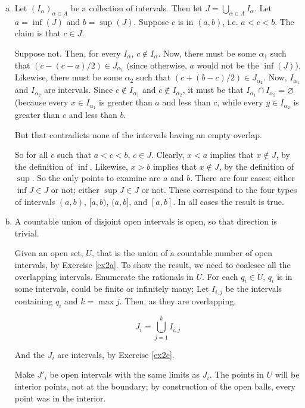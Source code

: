 \documentclass[11pt,oneside]{article}
\numberwithin{equation}{section}
\theoremstyle{definition}
\begin{document}
\begin{solution}
\begin{enumerate}[(a)]
  \item
    \label{ex2c}
    Let $(I_\alpha)_{\alpha \in A}$ be a collection of intervals.  Then
    let $J = \bigcup \limits _ { \alpha \in A} I_\alpha$.  Let $a =
    \inf(J)$ and $b = \sup(J)$.  Suppose $c$ is in $(a, b)$, i.e.  $
    a< c < b$.  The claim is that $c \in J$.

    Suppose not.  Then, for every $I_\alpha$, $c \notin I_\alpha$.
    Now, there must be some $\alpha_1$ such that $(c - (c-a) / 2) \in
    J_{\alpha_1}$ (since otherwise, $a$ would not be the $\inf(J)$).
    Likewise, there must be some $\alpha_2$ such that $(c + (b -c) /2
    ) \in J_{\alpha_2}$.  Now, $I_{\alpha_1}$ and $I_{\alpha_2}$ are
    intervals.  Since $c \notin I_{\alpha_1}$ and $c \notin I_{\alpha_2}$,
    it must be that $I_{\alpha_1} \cap I_{\alpha_2} = \varnothing$ (because
    every $x \in I_{\alpha_1}$ is greater than
    $a$ and less than $c$, while every $y \in I_{\alpha_2}$ is
    greater than $c$ and less than $b$.

    But that contradicts none of the intervals having an empty overlap.

    So for all $c$ such that $ a < c < b$, $c \in J$.  Clearly,
    $ x < a$ implies that $x \notin J$, by the definition of $\inf$.
    Likewise, $x > b$ implies that $x \notin J$, by the definition of
    $\sup$.  So the only points to examine are $a$ and $b$.  There are four
    cases; either $\inf J \in J$ or not; either $\sup J \in J$ or not.  These
    correspond to the four types of intervals $(a,b)$, $[a, b)$, $(a,b]$, and
    $[a, b]$.  In all cases the result is true.

  \item
    A countable union of disjoint open intervals is open, so
    that direction is trivial.

    Given an open set, $U$, that is the union of a countable number of
    open intervals, by Exercise \ref{ex2a}.  To show the result, we
    need to coalesce all the overlapping intervals.  Enumerate the
    rationals in $U$.  For each $q_i \in U$, $q_i$ is in some
    intervals, could be finite or infinitely many; Let $I_{i,j}$ be the
    intervals containing $q_i$ and $ k = \max{j}$.
    Then, as they are overlapping,

    $$
    J_i = \bigcup \limits _ {j = 1} ^ k I_{i, j}
    $$

    And the $J_i$ are intervals, by Exercise \ref{ex2c}.

    Make $J'_i$ be open intervals with the same limits as $J_i$.  The points in $U$ will be
    interior points, not at the boundary; by construction of the open balls, every point was in the
    interior. 


\end{enumerate}
\end{solution}
\end{document}
